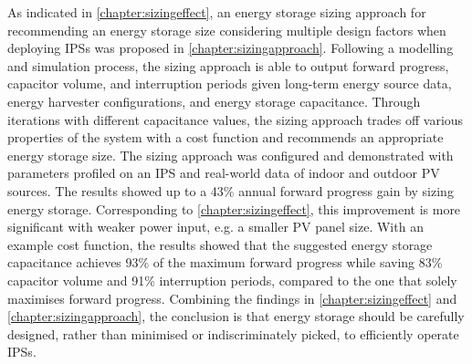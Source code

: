 As indicated in \cref{chapter:sizingeffect}, an energy storage sizing approach for recommending an energy storage size considering multiple design factors when deploying IPSs was proposed in \cref{chapter:sizingapproach}.
Following a modelling and simulation process, the sizing approach is able to output forward progress, capacitor volume, and interruption periods given long-term energy source data, energy harvester configurations, and energy storage capacitance.
Through iterations with different capacitance values, the sizing approach trades off various properties of the system with a cost function and recommends an appropriate energy storage size. 
The sizing approach was configured and demonstrated with parameters profiled on an IPS and real-world data of indoor and outdoor PV sources. 
The results showed up to a 43\% annual forward progress gain by sizing energy storage.
Corresponding to \cref{chapter:sizingeffect}, this improvement is more significant with weaker power input, e.g. a smaller PV panel size. 
With an example cost function, the results showed that the suggested energy storage capacitance achieves 93\% of the maximum forward progress while saving 83\% capacitor volume and 91\% interruption periods, compared to the one that solely maximises forward progress.
Combining the findings in \cref{chapter:sizingeffect} and \cref{chapter:sizingapproach}, the conclusion is that energy storage should be carefully designed, rather than minimised or indiscriminately picked, to efficiently operate IPSs. 


